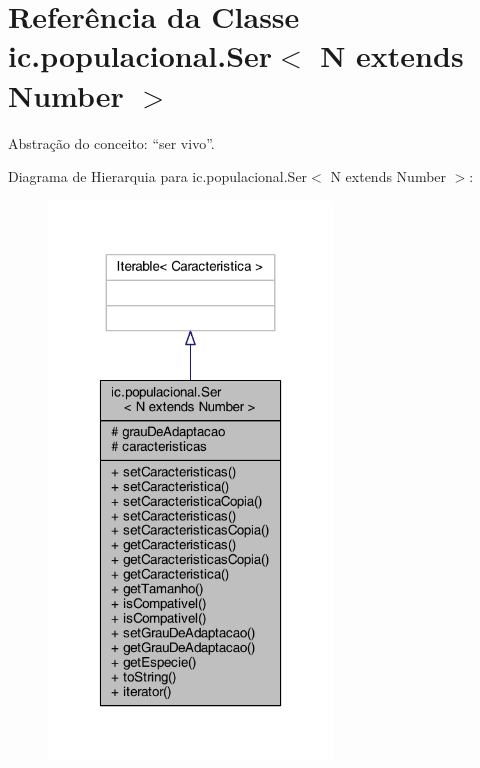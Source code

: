 \hypertarget{classic_1_1populacional_1_1_ser_3_01_n_01extends_01_number_01_4}{\section{Referência da Classe ic.\-populacional.\-Ser$<$ N extends Number $>$}
\label{classic_1_1populacional_1_1_ser_3_01_n_01extends_01_number_01_4}
}


Abstração do conceito\-: “ser vivo”.  




Diagrama de Hierarquia para ic.\-populacional.\-Ser$<$ N extends Number $>$\-:\nopagebreak
\begin{figure}[H]
\begin{center}
\leavevmode
\includegraphics[width=214pt]{classic_1_1populacional_1_1_ser_3_01_n_01extends_01_number_01_4__inherit__graph}
\end{center}
\end{figure}


